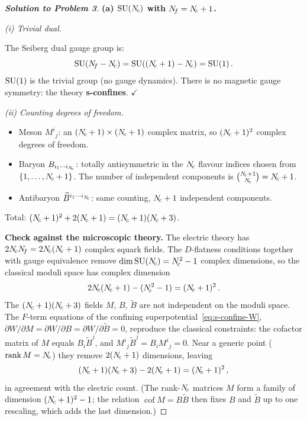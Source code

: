 \documentclass[11pt,a4paper]{article}
\begin{document}
\begin{proof}[\textbf{Solution to Problem 3}]

\textbf{(a) $\mathrm{SU}(N_{\!c})$ with $N_{\!f} = N_{\!c} + 1$.}

\textit{(i) Trivial dual.}

The Seiberg dual gauge group is:
\[
  \mathrm{SU}(N_{\!f} - N_{\!c}) = \mathrm{SU}((N_{\!c} + 1) - N_{\!c}) = \mathrm{SU}(1)\,.
\]
$\mathrm{SU}(1)$ is the trivial group (no gauge dynamics).  There is no
magnetic gauge symmetry: the theory \textbf{s-confines}.
\quad$\checkmark$

\textit{(ii) Counting degrees of freedom.}

\begin{itemize}
  \item Meson $M^i{}_j$: an $(N_{\!c} + 1) \times (N_{\!c} + 1)$ complex
    matrix, so $(N_{\!c} + 1)^2$ complex degrees of freedom.
  \item Baryon $B_{i_1 \cdots i_{N_{\!c}}}$: totally antisymmetric in
    the $N_{\!c}$ flavour indices chosen from $\{1, \ldots, N_{\!c} + 1\}$.
    The number of independent components is
    $\binom{N_{\!c} + 1}{N_{\!c}} = N_{\!c} + 1$.
  \item Antibaryon $\widetilde{B}^{i_1 \cdots i_{N_{\!c}}}$: same
    counting, $N_{\!c} + 1$ independent components.
\end{itemize}

Total: $(N_{\!c} + 1)^2 + 2(N_{\!c} + 1) = (N_{\!c} + 1)(N_{\!c} + 3)$.

\textbf{Check against the microscopic theory.}
The electric theory has $2N_{\!c}N_{\!f} = 2N_{\!c}(N_{\!c} + 1)$ complex squark
fields.  The $D$-flatness conditions together with gauge equivalence
remove $\dim \mathrm{SU}(N_{\!c}) = N_{\!c}^2 - 1$ complex dimensions, so the
classical moduli space has complex dimension
\[
  2N_{\!c}(N_{\!c} + 1) - (N_{\!c}^2 - 1) = (N_{\!c} + 1)^2\,.
\]
The $(N_{\!c}+1)(N_{\!c}+3)$ fields $M$, $B$, $\widetilde{B}$ are not
independent on the moduli space.  The $F$-term equations of the
confining superpotential~\eqref{eq:s-confine-W},
$\partial W/\partial M = \partial W/\partial B
= \partial W/\partial \widetilde{B} = 0$, reproduce the classical
constraints: the cofactor matrix of $M$ equals $B_i\widetilde{B}^j$,
and $M^i{}_j\widetilde{B}^j = B_i M^i{}_j = 0$.  Near a generic
point ($\operatorname{rank} M = N_{\!c}$) they remove $2(N_{\!c} + 1)$
dimensions, leaving
\[
  (N_{\!c} + 1)(N_{\!c} + 3) - 2(N_{\!c} + 1) = (N_{\!c} + 1)^2\,,
\]
in agreement with the electric count.  (The rank-$N_{\!c}$ matrices $M$
form a family of dimension $(N_{\!c}+1)^2 - 1$; the relation
$\operatorname{cof} M = B\widetilde{B}$ then fixes $B$ and
$\widetilde{B}$ up to one rescaling, which adds the last dimension.)


\end{proof}
\end{document}
